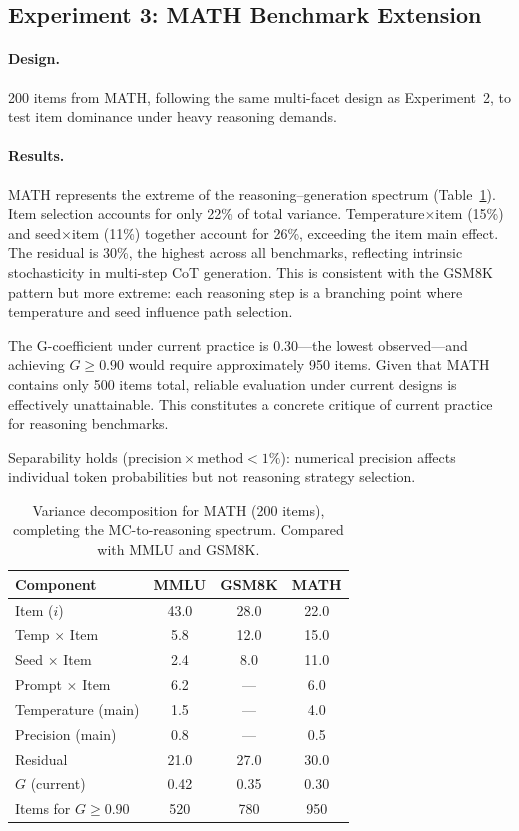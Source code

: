 \documentclass[11pt]{article}
\newcommand{\gcoeff}{G}
\begin{document}
\subsection{Experiment 3: MATH Benchmark Extension}
\label{sec:exp3}

\paragraph{Design.}
200 items from MATH, following the same multi-facet design as Experiment~2, to test item dominance under heavy reasoning demands.

\paragraph{Results.}
MATH represents the extreme of the reasoning--generation spectrum (Table~\ref{tab:math}).
Item selection accounts for only 22\% of total variance.
Temperature$\times$item (15\%) and seed$\times$item (11\%) together account for 26\%, exceeding the item main effect.
The residual is 30\%, the highest across all benchmarks, reflecting intrinsic stochasticity in multi-step CoT generation.
This is consistent with the GSM8K pattern but more extreme: each reasoning step is a branching point where temperature and seed influence path selection.

The G-coefficient under current practice is 0.30---the lowest observed---and achieving $\gcoeff \geq 0.90$ would require approximately 950 items.
Given that MATH contains only 500 items total, reliable evaluation under current designs is effectively unattainable.
This constitutes a concrete critique of current practice for reasoning benchmarks.

Separability holds ($\text{precision} \times \text{method} < 1\%$): numerical precision affects individual token probabilities but not reasoning strategy selection.

\begin{table}[t]
\centering
\caption{Variance decomposition for MATH (200 items), completing the MC-to-reasoning spectrum. Compared with MMLU and GSM8K.}
\label{tab:math}
\begin{tabular}{lccc}
\toprule
\textbf{Component} & \textbf{MMLU} & \textbf{GSM8K} & \textbf{MATH} \\
\midrule
Item ($i$) & 43.0 & 28.0 & 22.0 \\
Temp $\times$ Item & 5.8 & 12.0 & 15.0 \\
Seed $\times$ Item & 2.4 & 8.0 & 11.0 \\
Prompt $\times$ Item & 6.2 & --- & 6.0 \\
Temperature (main) & 1.5 & --- & 4.0 \\
Precision (main) & 0.8 & --- & 0.5 \\
Residual & 21.0 & 27.0 & 30.0 \\
\midrule
$\gcoeff$ (current) & 0.42 & 0.35 & 0.30 \\
Items for $\gcoeff \geq 0.90$ & 520 & 780 & 950 \\
\bottomrule
\end{tabular}
\end{table}
\end{document}

